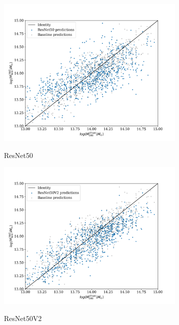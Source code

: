 \begin{figure}[H]
\begin{subfigure}{.325\textwidth}
    \centering
    \includegraphics[width=\linewidth]{images/Chapter4/Results/test_ResNet50_scatter.png}
    \label{fig:test_ResNet50_scatter}
    \caption{ResNet50}
\end{subfigure}
\begin{subfigure}{.325\textwidth}
    \centering
    \includegraphics[width=\linewidth]{images/Chapter4/Results/test_ResNet50V2_scatter.png}
    \label{fig:test_ResNet50V2_scatter}
    \caption{ResNet50V2}
\end{subfigure}
\begin{subfigure}{.325\textwidth}

\end{subfigure}
\end{figure}
